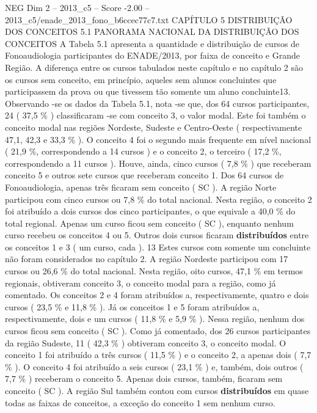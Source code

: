 \begin{textsample}{NEG Dim 2 – 2013\_c5 – Score -2.00 – 2013\_c5/enade\_2013\_fono\_b6ccec77c7.txt}  \label{ex:f2_neg_062}
CAPÍTULO 5 DISTRIBUIÇÃO DOS CONCEITOS 5.1 PANORAMA NACIONAL DA DISTRIBUIÇÃO DOS CONCEITOS A Tabela 5.1 apresenta a quantidade e distribuição de cursos de Fonoaudiologia participantes do ENADE/2013, por faixa de conceito e Grande Região.
A diferença entre os cursos tabulados neste capítulo e no capítulo 2 são os cursos sem conceito, em princípio, aqueles sem alunos concluintes que participassem da prova ou que tivessem tão somente um aluno concluinte13.
Observando -se os dados da Tabela 5.1, nota -se que, dos 64 cursos participantes, 24 ( 37,5 \% ) classificaram -se com conceito 3, o valor modal.
Este foi também o conceito modal nas regiões Nordeste, Sudeste e Centro-Oeste ( respectivamente 47,1, 42,3 e 33,3 \% ).
O conceito 4 foi o segundo mais frequente em nível nacional ( 21,9 \%, correspondendo a 14 cursos ) e o conceito 2, o terceiro ( 17,2 \%, correspondendo a 11 cursos ).
Houve, ainda, cinco cursos ( 7,8 \% ) que receberam conceito 5 e outros sete cursos que receberam conceito 1.
Dos 64 cursos de Fonoaudiologia, apenas três ficaram sem conceito ( SC ).
A região Norte participou com cinco cursos ou 7,8 \% do total nacional.
Nesta região, o conceito 2 foi atribuído a dois cursos dos cinco participantes, o que equivale a 40,0 \% do total regional.
Apenas um curso ficou sem conceito ( SC ), enquanto nenhum curso recebeu os conceitos 4 ou 5.
Outros dois cursos ficaram \textbf{distribuídos} entre os conceitos 1 e 3 ( um curso, cada ). 13 Estes cursos com somente um concluinte não foram considerados no capítulo 2.
A região Nordeste participou com 17 cursos ou 26,6 \% do total nacional.
Nesta região, oito cursos, 47,1 \% em termos regionais, obtiveram conceito 3, o conceito modal para a região, como já comentado.
Os conceitos 2 e 4 foram atribuídos a, respectivamente, quatro e dois cursos ( 23,5 \% e 11,8 \% ).
Já os conceitos 1 e 5 foram atribuídos a, respectivamente, dois e um cursos ( 11,8 \% e 5,9 \% ).
Nessa região, nenhum dos cursos ficou sem conceito ( SC ).
Como já comentado, dos 26 cursos participantes da região Sudeste, 11 ( 42,3 \% ) obtiveram conceito 3, o conceito modal.
O conceito 1 foi atribuído a três cursos ( 11,5 \% ) e o conceito 2, a apenas dois ( 7,7 \% ).
O conceito 4 foi atribuído a seis cursos ( 23,1 \% ) e, também, dois outros ( 7,7 \% ) receberam o conceito 5.
Apenas dois cursos, também, ficaram sem conceito ( SC ).
A região Sul também contou com cursos \textbf{distribuídos} em quase todas as faixas de conceitos, a exceção do conceito 1 sem nenhum curso.

\end{textsample}
